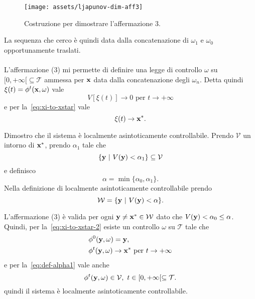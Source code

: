 \begin{steps}
    \hfill
    \begin{minipage}{.8\textwidth}
        \begin{figure}[H]
            \centering
            \texttt{[image: assets/ljapunov-dim-aff3]}
            \caption[Costruzione 3 per teorema di Ljapunov]{Costruzione per dimostrare
            l'affermazione 3.}
            \label{fig:ljapunov-dim-aff3}
        \end{figure}
    \end{minipage}

    La sequenza che cerco è quindi data dalla concatenazione di
    $\omega_1$ e $\omega_0$ opportunamente traslati.

    \hfill\openbox\paragraph{}

    L'affermazione (3) mi permette di definire una legge di controllo
    $\omega$ su $[0, +\infty[ \subseteq \mathcal T$ ammessa per $\mathbf{x}$
    data dalla concatenazione degli $\omega_n$.
    Detta quindi $\xi(t) = \phi^t(\mathbf{x}, \omega)$ vale
    \begin{equation*}
        V[\xi(t)] \to 0 \text{ per } t \to +\infty
    \end{equation*}
    e per la~\eqref{eq:xi-to-xstar} vale
    \begin{equation}
        \xi(t) \to \mathbf{x}^*.
        \label{eq:xi-to-xstar-2}
    \end{equation}

    \item Dimostro che il sistema è localmente asintoticamente
    controllabile.
    Prendo $\mathcal V$ un intorno di $\mathbf{x}^*$, prendo $\alpha_1$ tale che
    \begin{equation}
     \{\mathbf{y}\ |\ V(\mathbf{y}) < \alpha_1 \} \subseteq \mathcal V
        \label{eq:def-alpha1}
    \end{equation}
    e definisco
    \begin{equation*}
        \alpha = \min\{\alpha_0, \alpha_1\}.
    \end{equation*}
    Nella definizione di localmente asintoticamente controllabile prendo
    \begin{equation*}
            \mathcal W = \{\mathbf{y}\ |\ V(\mathbf{y}) < \alpha\}.
    \end{equation*}

    L'affermazione (3) è valida per ogni $\mathbf{y} \neq \mathbf{x}^* \in \mathcal W$
    dato che $V(\mathbf{y}) < \alpha_0 \leq \alpha$.
    Quindi, per la~\eqref{eq:xi-to-xstar-2} esiste un controllo $\omega$
    su $\mathcal T$ tale che
    \begin{align*}
        &\phi^0(\mathbf{y}, \omega) = \mathbf{y}, \\
        &\phi^t(\mathbf{y}, \omega) \to \mathbf{x}^* \text{ per } t \to +\infty
    \end{align*}
    e per la~\eqref{eq:def-alpha1} vale anche
    \begin{equation*}
        \phi^t(\mathbf{y}, \omega) \in \mathcal V, \ t \in [0, +\infty[ \subseteq \mathcal T.
    \end{equation*}
    quindi il sistema è localmente asintoticamente controllabile.


\end{steps}
